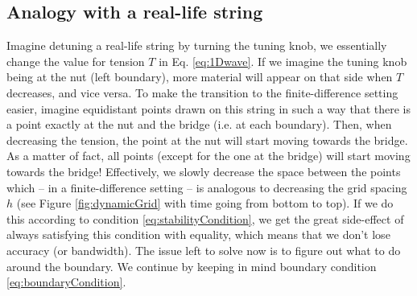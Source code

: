 \documentclass[dvipsnames]{article}
\begin{document}
\subsection{Analogy with a real-life string}
Imagine detuning a real-life string by turning the tuning knob, we essentially change the value for tension $T$ in Eq. \eqref{eq:1Dwave}. If we imagine the tuning knob being at the nut (left boundary), more material will appear on that side when $T$ decreases, and vice versa. To make the transition to the finite-difference setting easier, imagine equidistant points drawn on this string in such a way that there is a point exactly at the nut and the bridge (i.e. at each boundary). Then, when decreasing the tension, the point at the nut will start moving towards the bridge. As a matter of fact, all points (except for the one at the bridge) will start moving towards the bridge! Effectively, we slowly decrease the space between the points which -- in a finite-difference setting -- is analogous to decreasing the grid spacing $h$ (see Figure \ref{fig:dynamicGrid} with time going from bottom to top). If we do this according to condition \eqref{eq:stabilityCondition}, we get the great side-effect of always satisfying this condition with equality, which means that we don't lose accuracy (or bandwidth). The issue left to solve now is to figure out what to do around the boundary. We continue by keeping in mind boundary condition \eqref{eq:boundaryCondition}.

\end{document}
